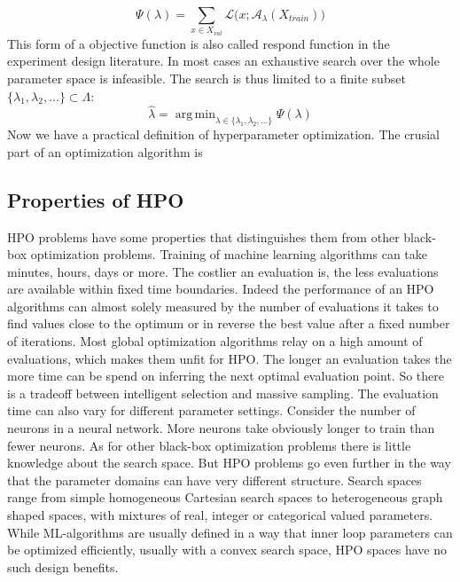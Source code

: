 \documentclass[english]{article}
\DeclareMathOperator*{\argmin}{arg\,min}
\begin{document}
\begin{equation}
  \Psi(\lambda) = \sum_{x \in X_{val}} \mathcal{L}\big(x;\mathcal{A}_\lambda(X_{train})\big)
\end{equation}
This form of a objective function is also called respond function in the experiment design literature. In most cases an exhaustive search over the whole parameter space is infeasible. The search is thus limited to a finite subset $\{\lambda_1, \lambda_2, ... \} \subset \Lambda$:
\begin{equation}
  \hat{\lambda} = \argmin_{\lambda \in \{\lambda_1, \lambda_2, ... \}} \Psi(\lambda)
\label{empirical hypa_opt_1}
\end{equation}
Now we have a practical definition of hyperparameter optimization. The crusial part of an optimization algorithm is

\subsection{Properties of HPO}
HPO problems have some properties that distinguishes them from other black-box optimization problems. Training of machine learning algorithms can take minutes, hours, days or more. The costlier an evaluation is, the less evaluations are available within fixed time boundaries. Indeed the performance of an HPO algorithms can almost solely measured by the number of evaluations it takes to find values close to the optimum or in reverse the best value after a fixed number of iterations. Most global optimization algorithms relay on a high amount of evaluations, which makes them unfit for HPO. The longer an evaluation takes the more time can be spend on inferring the next optimal evaluation point. So there is a tradeoff between intelligent selection and massive sampling. The evaluation time can also vary for different parameter settings. Consider the number of neurons in a neural network. More neurons take obviously longer to train than fewer neurons.
As for other black-box optimization problems there is little knowledge about the search space. But HPO problems go even further in the way that the parameter domains can have very different structure. Search spaces range from simple homogeneous Cartesian search spaces to heterogeneous graph shaped spaces, with mixtures of real, integer or categorical valued parameters. While ML-algorithms are usually defined in a way that inner loop parameters can be optimized efficiently, usually with a convex search space, HPO spaces have no such design benefits.
\end{document}
